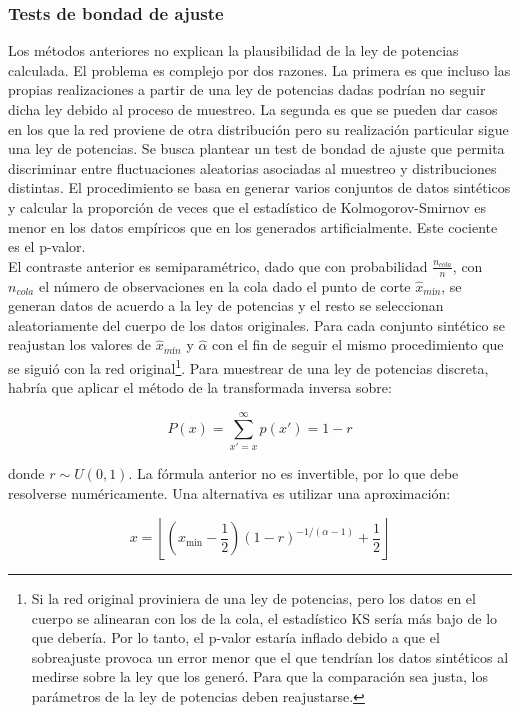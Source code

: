 \documentclass[12pt,a4paper]{report}
\begin{document}
	\subsubsection{Tests de bondad de ajuste}	
	Los métodos anteriores no explican la plausibilidad de la ley de potencias calculada. El problema es complejo por dos razones. La primera es que incluso las propias realizaciones a partir de una ley de potencias dadas podrían no seguir dicha ley debido al proceso de muestreo. La segunda es que se pueden dar casos en los que la red proviene de otra distribución pero su realización particular sigue una ley de potencias. Se busca plantear un test de bondad de ajuste que permita discriminar entre fluctuaciones aleatorias asociadas al muestreo y distribuciones distintas. El procedimiento se basa en generar varios conjuntos de datos sintéticos y calcular la proporción de veces que el estadístico de Kolmogorov-Smirnov es menor en los datos empíricos que en los generados artificialmente. Este cociente es el p-valor. \\
	
	El contraste anterior es semiparamétrico, dado que con probabilidad $\frac{n_{cola}}{n}$, con $n_{cola}$ el número de observaciones en la cola dado el punto de corte $\hat{x}_{mín}$, se generan datos de acuerdo a la ley de potencias y el resto se seleccionan aleatoriamente del cuerpo de los datos originales. Para cada conjunto sintético se reajustan los valores de $\hat{x}_{mín}$ y $\hat{\alpha}$ con el fin de seguir el mismo procedimiento que se siguió con la red original\footnote{Si la red original proviniera de una ley de potencias, pero los datos en el cuerpo se alinearan con los de la cola, el estadístico KS sería más bajo de lo que debería. Por lo tanto, el p-valor estaría inflado debido a que el sobreajuste provoca un error menor que el que tendrían los datos sintéticos al medirse sobre la ley que los generó. Para que la comparación sea justa, los parámetros de la ley de potencias deben reajustarse.}. Para muestrear de una ley de potencias discreta, habría que aplicar el método de la transformada inversa sobre:
	
	\begin{equation}
	P(x) = \sum_{x'=x}^{\infty}p(x') = 1 - r
	\end{equation}
	
	donde $r \sim U(0,1)$. La fórmula anterior no es invertible, por lo que debe resolverse numéricamente. Una alternativa es utilizar una aproximación:
	
	\begin{equation}
	x = \left\lfloor \left(x_{\min} - \frac{1}{2}\right)(1 - r)^{-1/(\alpha - 1)} + \frac{1}{2} \right\rfloor
	\end{equation}
	
\end{document}
